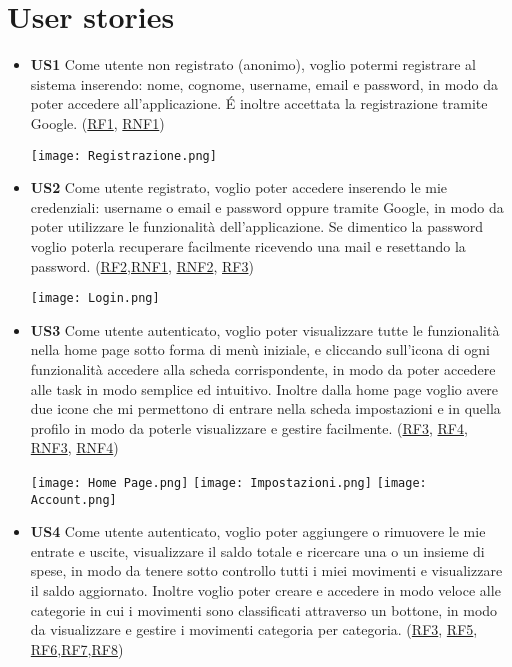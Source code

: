 \documentclass[a4paper,12pt]{article}
\begin{document}
\section*{User stories}
\begin{itemize} \setlength\itemsep{0.01em}
\item \textbf {US1} Come utente non registrato (anonimo), voglio potermi registrare al sistema inserendo: nome, cognome, username, email e password, in modo da poter accedere all'applicazione. É inoltre accettata la registrazione tramite Google. (\hyperlink{RF1}{RF1}, \hyperlink{RNF1}{RNF1})

\begin{center}
  \texttt{[image: Registrazione.png]}
\end{center}

\item\textbf {US2} Come utente registrato, voglio poter accedere inserendo le mie credenziali: username o email e password oppure tramite Google, in modo da poter utilizzare le funzionalità dell'applicazione. Se dimentico la password voglio poterla recuperare facilmente ricevendo una mail e resettando la password. (\hyperlink{RF2}{RF2},\hyperlink{RNF1}{RNF1}, \hyperlink{RNF2}{RNF2}, \hyperlink{RNF3}{RF3})

\begin{center}
  \texttt{[image: Login.png]}
\end{center}

\item \textbf {US3} Come utente autenticato, voglio poter visualizzare tutte le funzionalità nella home page sotto forma di menù iniziale, e cliccando sull'icona di ogni funzionalità accedere alla scheda corrispondente, in modo da poter accedere alle task in modo semplice ed intuitivo. Inoltre dalla home page voglio avere due icone che mi permettono di entrare nella scheda impostazioni e in quella profilo in modo da poterle visualizzare e gestire facilmente. (\hyperlink{RF3}{RF3}, \hyperlink{RF4}{RF4}, \hyperlink{RNF3}{RNF3}, \hyperlink{RNF4}{RNF4})

\begin{center}
  \texttt{[image: Home Page.png]}
  \texttt{[image: Impostazioni.png]}
  \texttt{[image: Account.png]}
\end{center}

\item \textbf {US4} Come utente autenticato, voglio poter aggiungere o rimuovere le mie entrate e uscite, visualizzare il saldo totale e ricercare una o un insieme di spese, in modo da tenere sotto controllo tutti i miei movimenti e visualizzare il saldo aggiornato. Inoltre voglio poter creare e accedere in modo veloce alle categorie in cui i movimenti sono classificati attraverso un bottone, in modo da visualizzare e gestire i movimenti categoria per categoria. (\hyperlink{RF3}{RF3}, \hyperlink{RF5}{RF5}, \hyperlink{RF6}{RF6},\hyperlink{RF7}{RF7},\hyperlink{RF8}{RF8})


\end{itemize}
\end{document}
